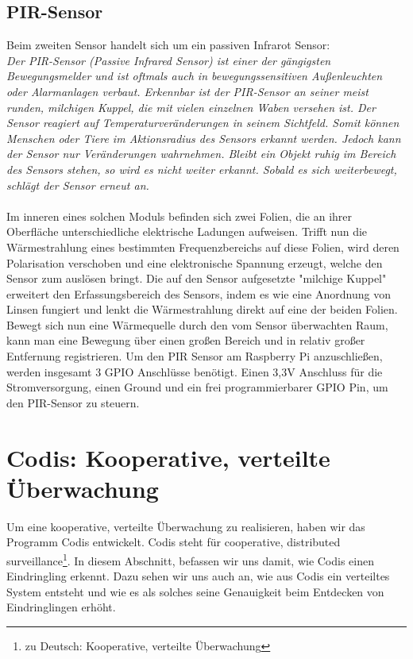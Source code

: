\documentclass[journal]{IEEEtran}
\begin{document}
\subsection{PIR-Sensor}
Beim zweiten Sensor handelt sich um ein passiven Infrarot Sensor:\\ \textit{Der PIR-Sensor (Passive Infrared Sensor) ist einer der gängigsten Bewegungsmelder und ist oftmals auch in bewegungssensitiven Außenleuchten oder Alarmanlagen verbaut. Erkennbar ist der PIR-Sensor an seiner meist runden, milchigen Kuppel, die mit vielen einzelnen Waben versehen ist. Der Sensor reagiert auf Temperaturveränderungen in seinem Sichtfeld. Somit können Menschen oder Tiere im Aktionsradius des Sensors erkannt werden. Jedoch kann der Sensor nur Veränderungen wahrnehmen. Bleibt ein Objekt ruhig im Bereich des Sensors stehen, so wird es nicht weiter erkannt.  Sobald es sich weiterbewegt, schlägt der Sensor erneut an.}\cite[S. 493]{Raspi}\\ \\ Im inneren eines solchen Moduls befinden sich zwei Folien, die an ihrer Oberfläche unterschiedliche elektrische Ladungen aufweisen. Trifft nun die Wärmestrahlung eines bestimmten Frequenzbereichs auf diese Folien, wird deren Polarisation verschoben und eine elektronische Spannung erzeugt, welche den Sensor zum auslösen bringt. Die auf den Sensor aufgesetzte "milchige Kuppel" erweitert den Erfassungsbereich des Sensors, indem es wie eine Anordnung von Linsen fungiert und lenkt die Wärmestrahlung direkt auf eine der beiden Folien. Bewegt sich nun eine Wärmequelle durch den vom Sensor überwachten Raum, kann man eine Bewegung über einen großen Bereich und in relativ großer Entfernung registrieren.\cite{pir} Um den PIR Sensor am Raspberry Pi anzuschließen, werden insgesamt 3 GPIO Anschlüsse benötigt. Einen 3,3V Anschluss für die Stromversorgung, einen Ground und ein frei programmierbarer GPIO Pin, um den PIR-Sensor zu steuern.


\section{Codis: Kooperative, verteilte Überwachung}

Um eine kooperative, verteilte Überwachung zu realisieren, haben wir das Programm Codis entwickelt. Codis steht für cooperative, distributed surveillance\footnote{zu Deutsch: Kooperative, verteilte Überwachung}. In diesem Abschnitt, befassen wir uns damit, wie Codis einen Eindringling erkennt. Dazu sehen wir uns auch an, wie aus Codis ein verteiltes System entsteht und wie es als solches seine Genauigkeit beim Entdecken von Eindringlingen erhöht.
\end{document}
